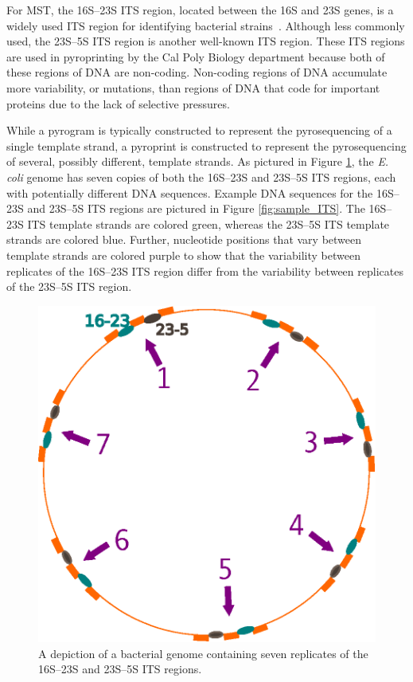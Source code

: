 \documentclass[12pt]{ucthesis}
\begin{document}
      For MST, the 16S--23S ITS region, located between the 16S and 23S genes,
      is a widely used ITS region for identifying bacterial
      strains~\cite{Boyer:ITS, Roth:Phylo, Tyler:Primers}. Although less
      commonly used, the 23S--5S ITS region is another well-known ITS region.
      These ITS regions are used in pyroprinting by the Cal Poly Biology
      department because both of these regions of DNA are non-coding.
      Non-coding regions of DNA accumulate more variability, or mutations, than
      regions of DNA that code for important proteins due to the lack of
      selective pressures.

      While a pyrogram is typically constructed to represent the pyrosequencing
      of a single template strand, a pyroprint is constructed to represent the
      pyrosequencing of several, possibly different, template strands. As
      pictured in Figure \ref{fig:genome}, the \textit{E. coli} genome has
      seven copies of both the 16S--23S and 23S--5S ITS regions, each with
      potentially different DNA sequences. Example DNA sequences for the
      16S--23S and 23S--5S ITS regions are pictured in Figure
      \ref{fig:sample_ITS}. The 16S--23S ITS template strands are colored
      green, whereas the 23S--5S ITS template strands are colored blue.
      Further, nucleotide positions that vary between template strands are
      colored purple to show that the variability between replicates of the
      16S--23S ITS region differ from the variability between replicates of the
      23S--5S ITS region.

      \begin{figure}[t]
         \centering
         \includegraphics[width=0.45\columnwidth]{graphics/genome_with_highlighted_regions.eps}
         \caption{A depiction of a bacterial genome containing seven replicates
                  of the 16S--23S and 23S--5S ITS regions.}
         \label{fig:genome}
      \end{figure}
\end{document}
